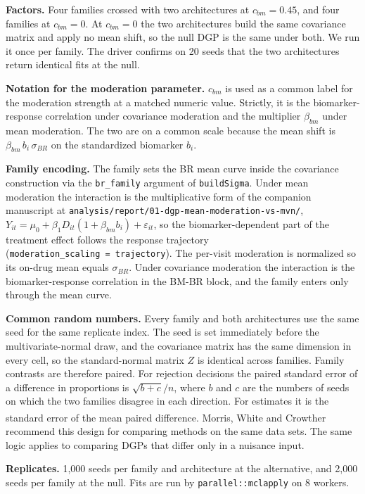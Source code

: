 \documentclass[
  11pt,
]{article}
\begin{document}
\textbf{Factors.} Four families crossed with two architectures at
\(c_{bm} = 0.45\), and four families at \(c_{bm} = 0\). At \(c_{bm} = 0\) the
two architectures build the same covariance matrix and apply no mean
shift, so the null DGP is the same under both. We run it once per
family. The driver confirms on 20 seeds that the two architectures
return identical fits at the null.

\textbf{Notation for the moderation parameter.} \(c_{bm}\) is used as a
common label for the moderation strength at a matched numeric value.
Strictly, it is the biomarker-response correlation under covariance
moderation and the multiplier \(\beta_{bm}\) under mean moderation. The
two are on a common scale because the mean shift is
\(\beta_{bm}\,b_i\,\sigma_{BR}\) on the standardized biomarker \(b_i\).

\textbf{Family encoding.} The family sets the BR mean curve inside the
covariance construction via the \texttt{br\_family} argument of \texttt{buildSigma}.
Under mean moderation the interaction is the multiplicative form of
the companion manuscript at
\texttt{analysis/report/01-dgp-mean-moderation-vs-mvn/},
\(Y_{it} = \mu_0 + \beta_1 D_{it}(1 + \beta_{bm} b_i) + \varepsilon_{it}\),
so the biomarker-dependent part of the treatment effect follows the
response trajectory (\texttt{moderation\_scaling\ =\ \textquotesingle{}trajectory\textquotesingle{}}). The
per-visit moderation is normalized so its on-drug mean equals
\(\sigma_{BR}\). Under covariance moderation the interaction is the
biomarker-response correlation in the BM-BR block, and the family
enters only through the mean curve.

\textbf{Common random numbers.} Every family and both architectures use
the same seed for the same replicate index. The seed is set immediately
before the multivariate-normal draw, and the covariance matrix has the
same dimension in every cell, so the standard-normal matrix \(Z\) is
identical across families. Family contrasts are therefore paired. For
rejection decisions the paired standard error of a difference in
proportions is \(\sqrt{b + c}/n\), where \(b\) and \(c\) are the numbers of
seeds on which the two families disagree in each direction. For
estimates it is the standard error of the mean paired difference.
Morris, White and Crowther\textsuperscript{} recommend this
design for comparing methods on the same data sets. The same logic
applies to comparing DGPs that differ only in a nuisance input.

\textbf{Replicates.} 1,000
seeds per family and architecture at the alternative, and
2,000
seeds per family at the null. Fits are run by \texttt{parallel::mclapply} on
8 workers.
\end{document}
